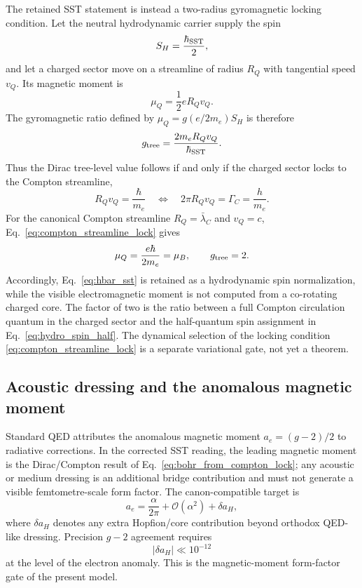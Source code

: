 \documentclass[11pt]{article}
\newcommand{\GammaC}{\Gamma_C}                                %
\newcommand{\lambdabarC}{\bar{\lambda}_C}
\begin{document}
The retained SST statement is instead a two-radius gyromagnetic locking condition.  Let the neutral hydrodynamic carrier supply the spin
\begin{equation}
    S_H=\frac{\hbar_{\rm SST}}{2},
\end{equation}
and let a charged sector move on a streamline of radius $R_Q$ with tangential speed $v_Q$.  Its magnetic moment is
\begin{equation}
    \mu_Q=\frac{1}{2}eR_Qv_Q.
    \label{eq:charge_streamline_mu}
\end{equation}
The gyromagnetic ratio defined by $\mu_Q=g(e/2m_e)S_H$ is therefore
\begin{equation}
    g_{\rm tree}
    =\frac{2m_e R_Qv_Q}{\hbar_{\rm SST}}.
    \label{eq:g_locking_general}
\end{equation}
Thus the Dirac tree-level value follows if and only if the charged sector locks to the Compton streamline,
\begin{equation}
    R_Qv_Q=\frac{\hbar}{m_e}
    \quad\Longleftrightarrow\quad
    2\pi R_Qv_Q=\GammaC=\frac{h}{m_e}.
    \label{eq:compton_streamline_lock}
\end{equation}
For the canonical Compton streamline $R_Q=\lambdabarC$ and $v_Q=c$, Eq.~\eqref{eq:compton_streamline_lock} gives
\begin{equation}
    \mu_Q=\frac{e\hbar}{2m_e}=\mu_B,
    \qquad
    g_{\rm tree}=2.
    \label{eq:bohr_from_compton_lock}
\end{equation}
Accordingly, Eq.~\eqref{eq:hbar_sst} is retained as a hydrodynamic spin normalization, while the visible electromagnetic moment is not computed from a co-rotating charged core.  The factor of two is the ratio between a full Compton circulation quantum in the charged sector and the half-quantum spin assignment in Eq.~\eqref{eq:hydro_spin_half}.  The dynamical selection of the locking condition \eqref{eq:compton_streamline_lock} is a separate variational gate, not yet a theorem.

\subsection{Acoustic dressing and the anomalous magnetic moment}

Standard QED attributes the anomalous magnetic moment $a_e=(g-2)/2$ to radiative corrections.  In the corrected SST reading, the leading magnetic moment is the Dirac/Compton result of Eq.~\eqref{eq:bohr_from_compton_lock}; any acoustic or medium dressing is an additional bridge contribution and must not generate a visible femtometre-scale form factor.  The canon-compatible target is
\begin{equation}
    a_e
    = \frac{\alpha}{2\pi} + \mathcal{O}(\alpha^2) + \delta a_H,
    \label{eq:ae}
\end{equation}
where $\delta a_H$ denotes any extra Hopfion/core contribution beyond orthodox QED-like dressing.  Precision $g-2$ agreement requires
\begin{equation}
    |\delta a_H| \ll 10^{-12}
    \label{eq:delta_aH_bound}
\end{equation}
at the level of the electron anomaly.  This is the magnetic-moment form-factor gate of the present model.
\end{document}
